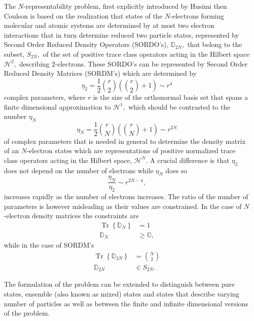 \documentclass[aps,preprint]{revtex4}%
\begin{document}
The $N$-representability problem, first explicitly introduced by Husimi
\cite{Husimi} then Coulson \cite{Coulson} is based on the realization that
states of the $N$-electrons forming molecular and atomic systems are
determined by at most two electron interactions that in turn determine reduced
two particle states, represented by Second Order Reduced Density Operators
(SORDO's), $\mathbb{D}_{2N},$ that belong to the subset, $S_{2N},$ of the set
of positive trace class operators acting in the Hilbert space $\mathcal{H}%
^{2},$ describing $2$-electrons. These SORDO's can be represented by Second
Order Reduced Density Matrices (SORDM's) which are determined by
\begin{equation}
\eta_{2}=\frac{1}{2}\binom{r}{2}\left(  \binom{r}{2}+1\right)  \sim r^{4}
\label{2DenSize}%
\end{equation}
complex parameters, where $r$ is the size of the orthonormal basis set that
spans a finite dimensional approximation to $\mathcal{H}^{1},$ which should be
contrasted to the number $\eta_{N}$
\begin{equation}
\eta_{N}=\frac{1}{2}\binom{r}{N}\left(  \binom{r}{N}+1\right)  \sim r^{2N}
\label{NDenSize}%
\end{equation}
of complex parameters that is needed in general to determine the density
matrix of an $N$-electron states which are representations of positive
normalized trace class operators acting in the Hilbert space, $\mathcal{H}%
^{N}$. A crucial difference is that $\eta_{2}$ does not depend on the number
of electrons while $\eta_{N}$ does so
\begin{equation}
\frac{\eta_{N}}{\eta_{2}}\sim r^{2N-4}, \label{RatioSize}%
\end{equation}
increases rapidly as the number of electrons increases. The ratio of the
number of parameters is however misleading as their values are constrained. In
the case of $N$-electron density matrices the constraints are
\begin{align}
\operatorname*{Tr}\left\{  \mathbb{D}_{N}\right\}   &  =1\nonumber\\
\mathbb{D}_{N}  &  \geq\mathbb{O},
\end{align}
while in the case of SORDM's
\begin{align}
\operatorname*{Tr}\left\{  \mathbb{D}_{2N}\right\}   &  =\binom{N}%
{2}\nonumber\\
\mathbb{D}_{2N}  &  \in S_{2N}.
\end{align}


The formulation of the problem can be extended to distinguish between pure
states, ensemble (also known as mixed) states and states that describe varying
number of particles as well as between the finite and infinite dimensional
versions of the problem.
\end{document}
